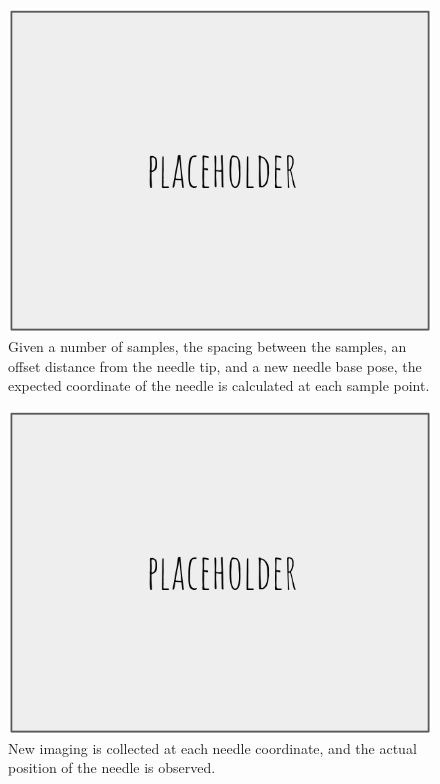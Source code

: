 \begin{figure}[h]
\includegraphics[width=1.0\textwidth]{Fig/placeholder.png}
\caption{Given a number of samples, the spacing between the samples, an offset distance from the needle tip, and a new needle base pose, the expected coordinate of the needle is calculated at each sample point.}
\label{fig:curve_fit_pt1}
\end{figure}

\begin{figure}[h]
\includegraphics[width=1.0\textwidth]{Fig/placeholder.png}
\caption{New imaging is collected at each needle coordinate, and the actual position of the needle is observed.}
\label{fig:curve_fit_pt2}
\end{figure}

